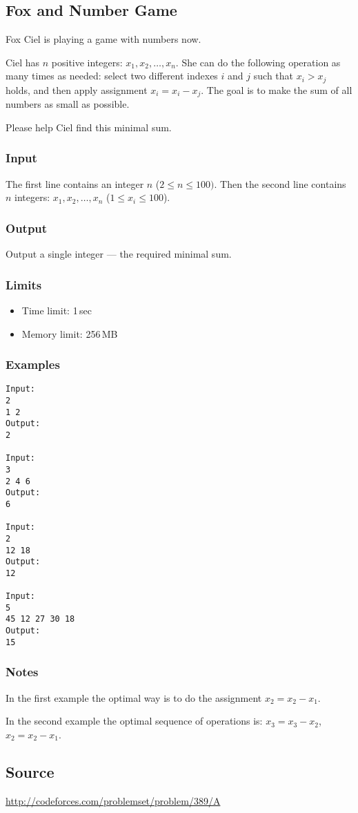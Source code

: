 \subsection{Fox and Number Game}

Fox Ciel is playing a game with numbers now.

Ciel has $n$ positive integers: $x_1,x_2,\ldots,x_n$.
She can do the following operation as many times as needed:
select two different indexes $i$ and $j$ such that $x_i>x_j$ holds,
and then apply assignment $x_i = x_i - x_j$.
The goal is to make the sum of all numbers as small as possible.

Please help Ciel find this minimal sum.

\subsubsection*{Input}
The first line contains an integer $n$ ($2 \leq n \leq 100).$
Then the second line contains $n$ integers: $x_1,x_2,\ldots,x_n$
($1\leq x_i \leq 100$).

\subsubsection*{Output}
Output a single integer --- the required minimal sum.

\subsubsection*{Limits}
\begin{itemize}
    \item Time limit: 1\,sec
    \item Memory limit: 256\,MB
\end{itemize}



\subsubsection*{Examples}
\begin{verbatim}
Input:
2
1 2
Output:
2

Input:
3
2 4 6
Output:
6

Input:
2
12 18
Output:
12

Input:
5
45 12 27 30 18
Output:
15
\end{verbatim}

\subsubsection*{Notes}
In the first example the optimal way is to do the assignment
$x_2 = x_2 - x_1$.

In the second example the optimal sequence of operations is:
$x_3 = x_3-x_2$, $x_2 = x_2-x_1$.

\subsection*{Source} \url{http://codeforces.com/problemset/problem/389/A}
